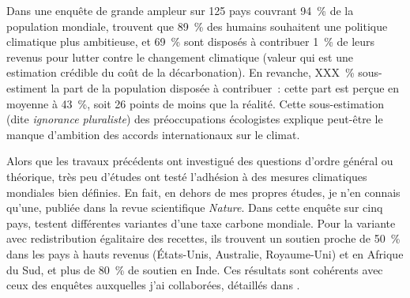 \documentclass[a5paper,french]{memoir}
\begin{document}
Dans une enquête de grande ampleur sur 125 pays couvrant 94~\% de la population mondiale, \citet{andre_actual_2024} trouvent que 89~\% des humains souhaitent une politique climatique plus ambitieuse, et 69~\% sont disposés à contribuer 1~\% de leurs revenus pour lutter contre le changement climatique (valeur qui est une estimation crédible du coût de la décarbonation). En revanche, XXX~\% sous-estiment la part de la population disposée à contribuer~: cette part est perçue en moyenne à 43~\%, soit 26 points de moins que la réalité. Cette sous-estimation (dite \textit{ignorance pluraliste}) des préoccupations écologistes explique peut-être le manque d'ambition des accords internationaux sur le climat. 

Alors que les travaux précédents ont investigué des questions d'ordre général ou théorique, très peu d'études ont testé l'adhésion à des mesures climatiques mondiales bien définies. En fait, en dehors de mes propres études, je n'en connais qu'une, publiée dans la revue scientifique \textit{Nature}. Dans cette enquête sur cinq pays, \citet{carattini_how_2019} testent différentes variantes d'une taxe carbone mondiale. Pour la variante avec redistribution égalitaire des recettes, ils trouvent un soutien proche de 50~\% dans les pays à hauts revenus (États-Unis, Australie, Royaume-Uni) et en Afrique du Sud, et plus de 80~\% de soutien en Inde. Ces résultats sont cohérents avec ceux des enquêtes auxquelles j'ai collaborées, détaillés dans \citet{fabre_global_2023}. 
\end{document}
